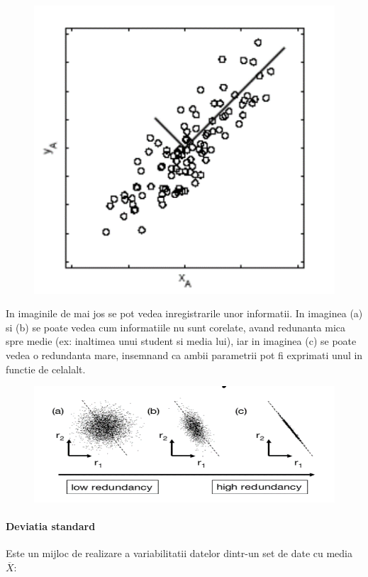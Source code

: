 \documentclass[12pt,oneside]{article}
\begin{document}
\begin{figure}[H]
\centering
\includegraphics[scale=0.5]{Picture1}
\end{figure}

In imaginile de mai jos se pot vedea inregistrarile unor informatii. In imaginea (a) si (b) se poate vedea cum informatiile nu sunt corelate, avand redunanta mica spre medie (ex: inaltimea unui student si media lui), iar in imaginea (c) se poate vedea o redundanta mare, insemnand ca ambii parametrii pot fi exprimati unul in functie de celalalt.\cite{pca_shlens}

\begin{figure}[H]
\centering
\includegraphics[width=\linewidth]{Picture2}
\end{figure}

\paragraph{Deviatia standard} Este un mijloc de realizare a variabilitatii datelor dintr-un set de date cu media $\overline{X}$:
\end{document}
